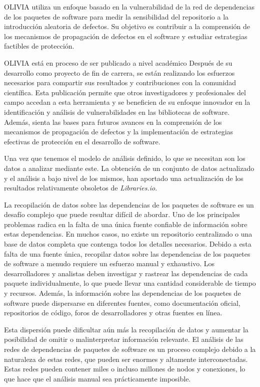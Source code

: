 OLIVIA utiliza un enfoque basado en la vulnerabilidad de la red de dependencias de los paquetes de software para medir la sensibilidad 
del repositorio a la introducción aleatoria de defectos. Su objetivo es contribuir a la comprensión de los mecanismos de propagación 
de defectos en el software y estudiar estrategias factibles de protección.

OLIVIA está en proceso de ser publicado a nivel académico\cite{Seto-Rey20231}
Después de su desarrollo como proyecto de fin de carrera, se están realizando los esfuerzos necesarios para 
compartir sus resultados y contribuciones con la comunidad científica.
Esta publicación permite que otros investigadores y profesionales del campo accedan a esta herramienta y se 
beneficien de su enfoque innovador en la identificación y análisis de vulnerabilidades en las bibliotecas de software. 
Además, sienta las bases para futuros avances
en la comprensión de los mecanismos de propagación de defectos y la implementación de estrategias efectivas de 
protección en el desarrollo de software.

Una vez que tenemos el modelo de análisis definido, lo que se necesitan son los datos a analizar mediante este.
La obtención de un conjunto de datos actualizado y el análisis a bajo nivel de los mismos, han aportado una 
actualización de los resultados relativamente obsoletos de \textit{Libraries.io}.

La recopilación de datos sobre las dependencias de los paquetes de software es un desafío complejo que puede 
resultar difícil de abordar.
Uno de los principales problemas radica en la falta de una única fuente confiable de información sobre estas dependencias.
En muchos casos, no existe un repositorio centralizado o una base de datos completa que contenga todos los detalles necesarios.
Debido a esta falta de una fuente única, recopilar datos sobre las dependencias de los paquetes de software a menudo 
requiere un esfuerzo manual y exhaustivo.
Los desarrolladores y analistas deben investigar y rastrear las dependencias de cada paquete individualmente, lo 
que puede llevar una cantidad considerable de tiempo y recursos.
Además, la información sobre las dependencias de los paquetes de software puede dispersarse en diferentes fuentes, 
como documentación oficial, repositorios de código, foros de desarrolladores y otras fuentes en línea.


Esta dispersión puede dificultar aún más la recopilación de datos y aumentar la posibilidad de omitir o malinterpretar 
información relevante.
El análisis de las redes de dependencias de paquetes de software es un proceso complejo debido a la naturaleza de estas 
redes, que pueden ser enormes y altamente interconectadas. Estas redes pueden contener miles o incluso millones de 
nodos y conexiones, lo que hace que el análisis manual sea prácticamente imposible.


